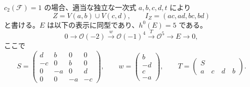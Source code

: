 \begin{lemma}[二平面からの拡大をすべて書く]
\label{lem:two-planes-extensions}
$c_2(\mathcal F)=1$ の場合、適当な独立な一次式 $a,b,c,d,t$ により
\[
 Z=V(a,b)\cup V(c,d),\qquad I_Z=(ac,ad,bc,bd)
\]
と書ける。$E$ は以下の表示に同型であり、$h^0(E)=5$ である。
\begin{equation}
 0\longrightarrow\mathcal O(-2)\xrightarrow{w}\mathcal O(-1)^4
 \xrightarrow{T}\mathcal O^5\longrightarrow E\longrightarrow0,
 \label{eq:two-plane-E-resolution}
\end{equation}
ここで
\[
 S=\begin{pmatrix}
 d&b&0&0\\-c&0&b&0\\0&-a&0&d\\0&0&-a&-c
 \end{pmatrix},\qquad
 w=\begin{pmatrix}b\\-d\\c\\-a\end{pmatrix},\qquad
 T=\begin{pmatrix}S\\ a\quad c\quad d\quad b\end{pmatrix}.
\]
\end{lemma}


